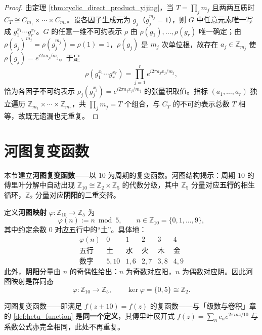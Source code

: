 \begin{proof}
由定理 \ref{thm:cyclic_direct_product_yijing}，当 $T = \prod_j m_j$ 且两两互质时 $C_T \cong C_{m_1} \times \cdots \times C_{m_r}$。设各因子生成元为 $g_j$（$g_j^{m_j} = 1$），则 $G$ 中任意元素唯一写成 $g_1^{x_1} \cdots g_r^{x_r}$。$G$ 的任意一维不可约表示 $\rho$ 由 $\rho(g_1),\dots,\rho(g_r)$ 唯一确定；由 $\rho(g_j)^{m_j} = \rho(g_j^{m_j}) = \rho(1) = 1$，$\rho(g_j)$ 是 $m_j$ 次单位根，故存在 $a_j \in \mathbb{Z}_{m_j}$ 使 $\rho(g_j) = e^{i2\pi a_j/m_j}$。于是
\[
\rho(g_1^{x_1}\cdots g_r^{x_r}) = \prod_{j=1}^r e^{i2\pi a_j x_j / m_j},
\]
恰为各因子不可约表示 $\rho_j(g_j^{x_j}) = e^{i2\pi a_j x_j/m_j}$ 的张量积取值。指标 $(a_1,\dots,a_r)$ 独立遍历 $\mathbb{Z}_{m_1}\times\cdots\times\mathbb{Z}_{m_r}$，共 $\prod_j m_j = T$ 个组合，与 $C_T$ 的不可约表示总数 $T$ 相等，故既无遗漏也无重复。
\end{proof}

\section{河图复变函数}

本节建立\textbf{河图复变函数}——以 $10$ 为周期的复变函数。河图结构揭示：周期 $10$ 的傅里叶分解中自动出现 $\mathbb{Z}_{10} \cong \mathbb{Z}_2 \times \mathbb{Z}_5$ 的代数分级，其中 $\mathbb{Z}_5$ 分量对应\textbf{五行}的相生循环，$\mathbb{Z}_2$ 分量对应\textbf{阴阳}的二重交替。

\begin{definition}\label{def:hetu_mapping_yijing}
定义\textbf{河图映射} $\varphi: \mathbb{Z}_{10} \to \mathbb{Z}_5$ 为
\[
\varphi(n) := n \bmod 5, \qquad n \in \mathbb{Z}_{10} = \{0, 1, \dots, 9\},
\]
其中约定余数 $0$ 对应五行中的“土”。具体地：
\[
\begin{array}{c|ccccc}
\varphi(n) & 0 & 1 & 2 & 3 & 4 \\
\hline
\text{五行} & \text{土} & \text{水} & \text{火} & \text{木} & \text{金} \\
\text{数字} & 5, 10 & 1, 6 & 2, 7 & 3, 8 & 4, 9
\end{array}
\]
此外，\textbf{阴阳}分量由 $n$ 的奇偶性给出：$n$ 为奇数对应阳，$n$ 为偶数对应阴。因此河图映射是群同态
\[
\varphi: \mathbb{Z}_{10} \to \mathbb{Z}_5, \qquad \ker \varphi = \{0, 5\} \cong \mathbb{Z}_2.
\]
\end{definition}

\begin{remark}\label{def:hetu_function_yijing}
河图复变函数——即满足 $f(z + 10) = f(z)$ 的复函数——与「级数与卷积」章的 \cref{def:hetu_function} 是\textbf{同一个定义}，其傅里叶展开式 $f(z) = \sum_{n} c_n e^{2\pi i n z/10}$ 与系数公式亦完全相同，此处不再重复。
\end{remark}


